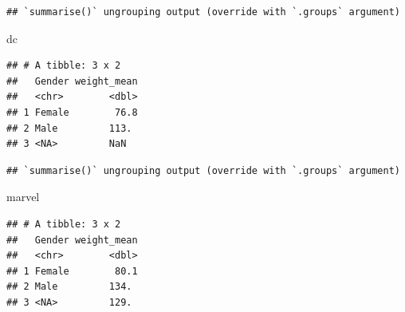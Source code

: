 \documentclass[
]{book}
\newenvironment{Shaded}{\begin{snugshade}}{\end{snugshade}}
\newcommand{\DataTypeTok}[1]{\textcolor[rgb]{0.13,0.29,0.53}{#1}}
\newcommand{\KeywordTok}[1]{\textcolor[rgb]{0.13,0.29,0.53}{\textbf{#1}}}
\newcommand{\NormalTok}[1]{#1}
\newcommand{\OperatorTok}[1]{\textcolor[rgb]{0.81,0.36,0.00}{\textbf{#1}}}
\newcommand{\OtherTok}[1]{\textcolor[rgb]{0.56,0.35,0.01}{#1}}
\newcommand{\StringTok}[1]{\textcolor[rgb]{0.31,0.60,0.02}{#1}}
\begin{document}
\begin{verbatim}
## `summarise()` ungrouping output (override with `.groups` argument)
\end{verbatim}

\begin{Shaded}
\begin{Highlighting}[]
\NormalTok{dc}
\end{Highlighting}
\end{Shaded}

\begin{verbatim}
## # A tibble: 3 x 2
##   Gender weight_mean
##   <chr>        <dbl>
## 1 Female        76.8
## 2 Male         113. 
## 3 <NA>         NaN
\end{verbatim}

\begin{Shaded}
\end{Shaded}

\begin{verbatim}
## `summarise()` ungrouping output (override with `.groups` argument)
\end{verbatim}

\begin{Shaded}
\begin{Highlighting}[]
\NormalTok{marvel}
\end{Highlighting}
\end{Shaded}

\begin{verbatim}
## # A tibble: 3 x 2
##   Gender weight_mean
##   <chr>        <dbl>
## 1 Female        80.1
## 2 Male         134. 
## 3 <NA>         129.
\end{verbatim}

\begin{Shaded}
\end{Shaded}
\end{document}

